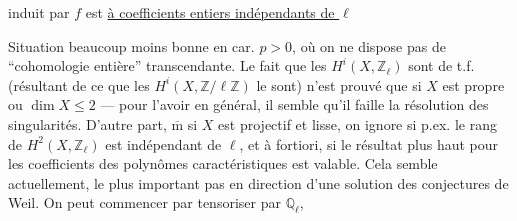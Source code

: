 induit par $f$ est \uline{à coefficients entiers indépendants de $\ell$}

Situation beaucoup moins bonne en car. $p>0$, où on ne dispose pas de ``cohomologie entière'' transcendante.
Le fait que les $H^i(X,\mathbb Z_\ell)$ sont de t.f. (résultant de ce que les $H^i(X,\mathbb Z/\ell\mathbb Z)$ le sont) n'est prouvé que si $X$ est propre ou $\dim X\leq 2$ — pour l'avoir en général, il semble qu'il faille la résolution des singularités.
D'autre part, $\overline{\mathrm m}$ si $X$ est projectif et lisse, on ignore si p.ex. le rang de $H^2(X,\mathbb Z_\ell)$ est indépendant de $\ell$, et à fortiori, si le résultat plus haut pour les coefficients des polynômes caractéristiques est valable.
Cela semble actuellement,  le  plus important pas  en direction d'une solution des conjectures de Weil.
 On peut commencer par tensoriser par $\mathbb Q_\ell$,
